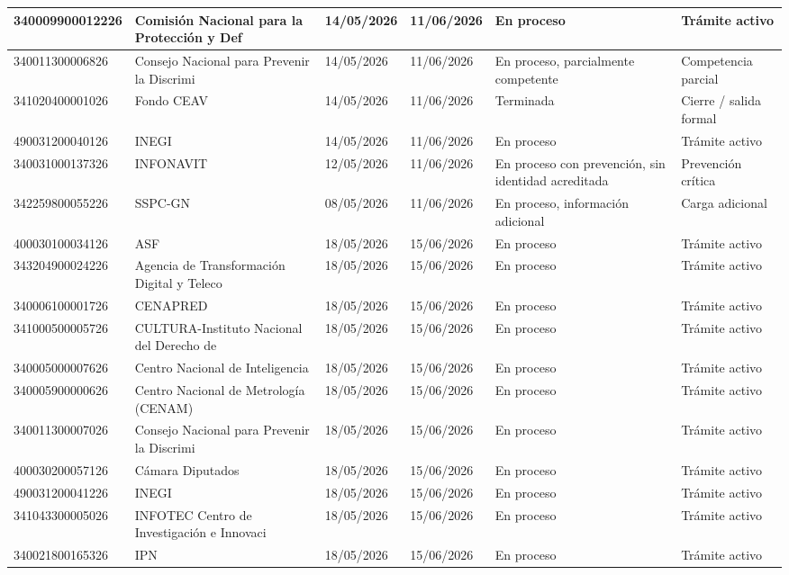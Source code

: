 \documentclass[10pt,letterpaper]{article}
\begin{document}
\begin{longtable}{|p{3.0cm}|p{4.2cm}|p{2.2cm}|p{2.2cm}|p{3.8cm}|p{4.2cm}|}
340009900012226 & Comisión Nacional para la Protección y Def & 14/05/2026 & 11/06/2026 & En proceso & Trámite activo \\ \hline
340011300006826 & Consejo Nacional para Prevenir la Discrimi & 14/05/2026 & 11/06/2026 & En proceso, parcialmente competente & Competencia parcial \\ \hline
341020400001026 & Fondo CEAV & 14/05/2026 & 11/06/2026 & Terminada & Cierre / salida formal \\ \hline
490031200040126 & INEGI & 14/05/2026 & 11/06/2026 & En proceso & Trámite activo \\ \hline
340031000137326 & INFONAVIT & 12/05/2026 & 11/06/2026 & En proceso con prevención, sin identidad acreditada & Prevención crítica \\ \hline
342259800055226 & SSPC-GN & 08/05/2026 & 11/06/2026 & En proceso, información adicional & Carga adicional \\ \hline
400030100034126 & ASF & 18/05/2026 & 15/06/2026 & En proceso & Trámite activo \\ \hline
343204900024226 & Agencia de Transformación Digital y Teleco & 18/05/2026 & 15/06/2026 & En proceso & Trámite activo \\ \hline
340006100001726 & CENAPRED & 18/05/2026 & 15/06/2026 & En proceso & Trámite activo \\ \hline
341000500005726 & CULTURA-Instituto Nacional del Derecho de  & 18/05/2026 & 15/06/2026 & En proceso & Trámite activo \\ \hline
340005000007626 & Centro Nacional de Inteligencia & 18/05/2026 & 15/06/2026 & En proceso & Trámite activo \\ \hline
340005900000626 & Centro Nacional de Metrología (CENAM) & 18/05/2026 & 15/06/2026 & En proceso & Trámite activo \\ \hline
340011300007026 & Consejo Nacional para Prevenir la Discrimi & 18/05/2026 & 15/06/2026 & En proceso & Trámite activo \\ \hline
400030200057126 & Cámara Diputados & 18/05/2026 & 15/06/2026 & En proceso & Trámite activo \\ \hline
490031200041226 & INEGI & 18/05/2026 & 15/06/2026 & En proceso & Trámite activo \\ \hline
341043300005026 & INFOTEC Centro de Investigación e Innovaci & 18/05/2026 & 15/06/2026 & En proceso & Trámite activo \\ \hline
340021800165326 & IPN & 18/05/2026 & 15/06/2026 & En proceso & Trámite activo \\ \hline

\end{longtable}
\end{document}
